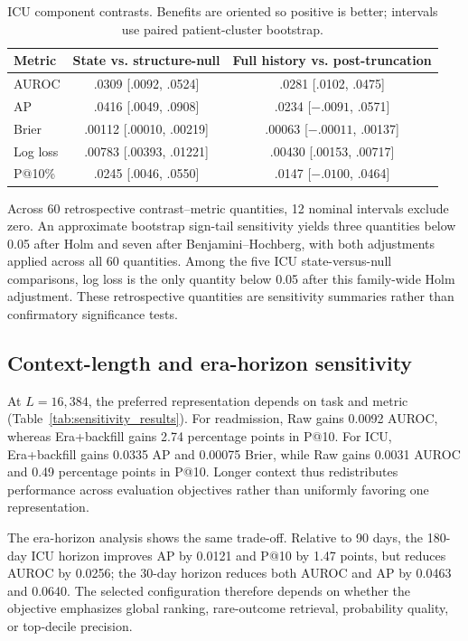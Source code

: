 \documentclass{article}
\begin{document}
\begin{table}[!htbp]
  \caption{ICU component contrasts. Benefits are oriented so positive is
  better; intervals use paired patient-cluster bootstrap.}
  \label{tab:component_results}
  \centering
  \small
  \begin{tabular*}{\linewidth}{@{\extracolsep{\fill}}lcc@{}}
    \toprule
    Metric & State vs. structure-null & Full history vs. post-truncation \\
    \midrule
    AUROC & .0309 [.0092, .0524] & .0281 [.0102, .0475] \\
    AP & .0416 [.0049, .0908] & .0234 [$-.0091$, .0571] \\
    Brier & .00112 [.00010, .00219] & .00063 [$-.00011$, .00137] \\
    Log loss & .00783 [.00393, .01221] & .00430 [.00153, .00717] \\
    P@10\% & .0245 [.0046, .0550] & .0147 [$-.0100$, .0464] \\
    \bottomrule
  \end{tabular*}
\end{table}

Across 60 retrospective contrast--metric quantities, 12 nominal intervals
exclude zero. An approximate bootstrap sign-tail sensitivity yields three quantities below 0.05
after Holm and seven after Benjamini--Hochberg, with both adjustments applied
across all 60 quantities. Among the five ICU state-versus-null comparisons,
log loss is the only quantity below 0.05 after this family-wide Holm adjustment.
These retrospective quantities are sensitivity summaries rather than
confirmatory significance tests.

\FloatBarrier

\subsection{Context-length and era-horizon sensitivity}

At $L=16{,}384$, the preferred representation depends on task and metric
(Table~\ref{tab:sensitivity_results}). For readmission, Raw gains 0.0092 AUROC,
whereas Era+backfill gains 2.74 percentage points in P@10. For ICU,
Era+backfill gains 0.0335 AP and 0.00075 Brier, while Raw gains 0.0031
AUROC and 0.49 percentage points in P@10. Longer context thus redistributes
performance across evaluation objectives rather than uniformly favoring one
representation.

The era-horizon analysis shows the same trade-off. Relative to 90 days, the
180-day ICU horizon improves AP by 0.0121 and P@10 by 1.47 points, but
reduces AUROC by 0.0256; the 30-day horizon reduces both AUROC and AP by
0.0463 and 0.0640. The selected configuration therefore depends on whether the
objective emphasizes global ranking, rare-outcome retrieval, probability
quality, or top-decile precision.
\end{document}
